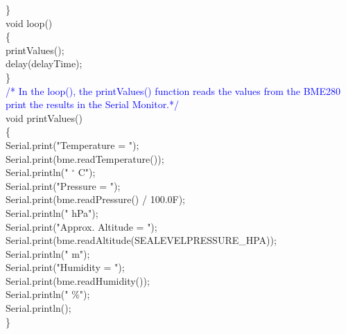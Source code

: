 \documentclass[12pt,a4paper]{article}
\begin{document}
\}\\[13pt]

void loop()\\
\{\\
printValues();\\
delay(delayTime);\\
\}\\[21pt]

\textcolor{blue} {/*  In the loop(), the printValues() function reads the values from the BME280\\ 
   print the results in the Serial Monitor.*/}\\[15pt]

void printValues() \\
\{\\
    Serial.print("Temperature = ");\\
    Serial.print(bme.readTemperature());\\

Serial.println(" $^{\circ}$ C");\\

    Serial.print("Pressure = ");\\
    Serial.print(bme.readPressure() / 100.0F);\\
    Serial.println(" hPa");\\

    Serial.print("Approx. Altitude = ");\\
    Serial.print(bme.readAltitude(SEALEVELPRESSURE\_HPA));\\
    Serial.println(" m");\\

    Serial.print("Humidity = ");\\
    Serial.print(bme.readHumidity());\\
    Serial.println(" \%");\\
    Serial.println();\\

    \}\\
\end{document}
